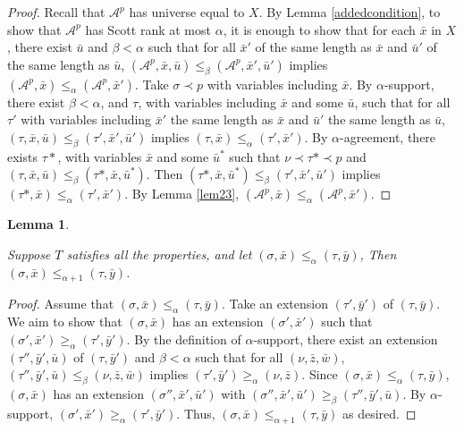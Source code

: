 \documentclass{article}
\newtheorem{lem}[thm]{Lemma}
\begin{document}
\begin{proof}  

Recall that $\mathcal{A}^p$ has universe equal to $X$.  By Lemma \ref{addedcondition}, to show that $\mathcal{A}^p$ has Scott rank at most $\alpha$, it is enough to show that for each $\bar{x}$ in $X$, there exist $\bar{u}$ and $\beta < \alpha$ such that for all $\bar{x}'$ of the same length as $\bar{x}$ and $\bar{u}'$ of the same length as $\bar{u}$, 
$(\mathcal{A}^p,\bar{x},\bar{u})\leq_\beta(\mathcal{A}^p,\bar{x}',\bar{u}')$ implies 
$(\mathcal{A}^p,\bar{x})\leq_\alpha(\mathcal{A}^p,\bar{x}')$.  
Take $\sigma\prec p$ with variables including $\bar{x}$.  By $\alpha$-support, there exist $\beta < \alpha$, and $\tau$, with variables including $\bar{x}$ and some $\bar{u}$, such that 
for all $\tau'$ with variables including $\bar{x}'$ the same length as $\bar{x}$ and $\bar{u}'$ the same length as $\bar{u}$, $(\tau,\bar{x},\bar{u})\leq_\beta(\tau',\bar{x}',\bar{u}')$ implies $(\tau,\bar{x})\leq_\alpha(\tau',\bar{x}')$.  By $\alpha$-agreement, there exists $\tau*$, with variables $\bar{x}$ and some $\bar{u}^*$ such that $\nu\prec\tau*\prec p$ and 
$(\tau,\bar{x},\bar{u})\leq_\beta(\tau*,\bar{x},\bar{u}^*)$.  Then $(\tau*,\bar{x},\bar{u}^*)\leq_\beta(\tau',\bar{x}',\bar{u}')$ implies $(\tau*,\bar{x})\leq_\alpha(\tau',\bar{x}')$.  By Lemma \ref{lem23}, $(\mathcal{A}^p,\bar{x})\leq_\alpha(\mathcal{A}^p,\bar{x}')$.  
\end{proof}  

\begin{lem}
\label{lem:alphaToAlphaPlus1}

Suppose $T$ satisfies all the properties, and let $(\sigma,\bar{x})\leq_{\alpha}(\tau,\bar{y})$,  Then $(\sigma,\bar{x})\leq_{\alpha+1}(\tau,\bar{y})$.

\end{lem}    

\begin{proof}
    Assume that $(\sigma,\bar{x})\leq_{\alpha}(\tau,\bar{y})$.  
    Take an extension $(\tau',\bar{y}')$ of $(\tau,\bar{y})$.
    We aim to show that $(\sigma,\bar{x})$ has an extension $(\sigma',\bar{x}')$ such that $(\sigma',\bar{x}')\geq_{\alpha}(\tau',\bar{y}')$.
    By the definition of $\alpha$-support, there exist an extension $(\tau'',\bar{y}',\bar{u})$ of $(\tau,\bar{y}')$ and $\beta<\alpha$ such that for all $(\nu,\bar{z},\bar{w})$,  $(\tau'',\bar{y}',\bar{u})\leq_\beta(\nu,\bar{z},\bar{w})$ implies $(\tau',\bar{y}')\geq_\alpha(\nu,\bar{z})$.
    Since $(\sigma,\bar{x})\leq_\alpha(\tau,\bar{y})$, $(\sigma,\bar{x})$ has an extension $(\sigma'',\bar{x}',\bar{u}')$ with $(\sigma'',\bar{x}',\bar{u}')\geq_\beta(\tau'',\bar{y}',\bar{u})$.
    By $\alpha$-support, $(\sigma',\bar{x}')\geq_{\alpha}(\tau',\bar{y}')$.
    Thus, $(\sigma,\bar{x})\leq_{\alpha+1}(\tau,\bar{y})$ as desired.
\end{proof}
\end{document}
